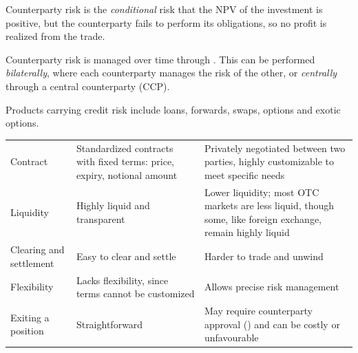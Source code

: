 \begin{crdefbox}
Counterparty risk is the \emph{conditional} risk that the NPV of the investment
is positive, but the counterparty fails to perform its obligations, so no profit
is realized from the trade.
\end{crdefbox}

Counterparty risk is managed over time through . This can be
performed \emph{bilaterally}, where each counterparty manages the risk of the
other, or \emph{centrally} through a central counterparty (CCP).

Products carrying credit risk include loans, forwards, swaps, options and exotic
options.


\begin{center}
\footnotesize
\begin{tabular}{L{2.6cm} L{5.7cm} L{6.2cm}}
\toprule
 &  &  \\
\midrule
Contract & Standardized contracts with fixed terms: price, expiry, notional
  amount & Privately negotiated between two parties, highly customizable to meet
  specific needs \\
Liquidity & Highly liquid and transparent &
  Lower liquidity; most OTC markets are less liquid, though some, like foreign
  exchange, remain highly liquid \\
Clearing and settlement & Easy to clear and settle &
  Harder to trade and unwind \\
Flexibility & Lacks flexibility, since terms cannot be customized &
  Allows precise risk management \\
Exiting a position & Straightforward &
  May require counterparty approval () and can be costly or
  unfavourable \\
\bottomrule
\end{tabular}
\end{center}


